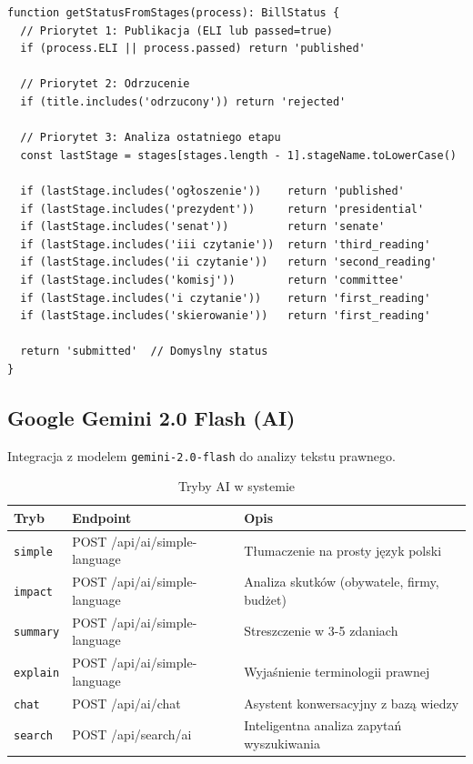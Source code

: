 \documentclass[12pt,a4paper]{article}
\begin{document}
\begin{lstlisting}[style=typescript, title=Algorytm getStatusFromStages()]
function getStatusFromStages(process): BillStatus {
  // Priorytet 1: Publikacja (ELI lub passed=true)
  if (process.ELI || process.passed) return 'published'
  
  // Priorytet 2: Odrzucenie
  if (title.includes('odrzucony')) return 'rejected'
  
  // Priorytet 3: Analiza ostatniego etapu
  const lastStage = stages[stages.length - 1].stageName.toLowerCase()
  
  if (lastStage.includes('ogłoszenie'))    return 'published'
  if (lastStage.includes('prezydent'))     return 'presidential'
  if (lastStage.includes('senat'))         return 'senate'
  if (lastStage.includes('iii czytanie'))  return 'third_reading'
  if (lastStage.includes('ii czytanie'))   return 'second_reading'
  if (lastStage.includes('komisj'))        return 'committee'
  if (lastStage.includes('i czytanie'))    return 'first_reading'
  if (lastStage.includes('skierowanie'))   return 'first_reading'
  
  return 'submitted'  // Domyslny status
}
\end{lstlisting}

\subsection{Google Gemini 2.0 Flash (AI)}

Integracja z modelem \texttt{gemini-2.0-flash} do analizy tekstu prawnego.

\begin{table}[H]
\centering
\renewcommand{\arraystretch}{1.3}
\begin{tabularx}{\textwidth}{l l X}
\toprule
\textbf{Tryb} & \textbf{Endpoint} & \textbf{Opis} \\
\midrule
\texttt{simple} & POST /api/ai/simple-language & Tłumaczenie na prosty język polski \\
\texttt{impact} & POST /api/ai/simple-language & Analiza skutków (obywatele, firmy, budżet) \\
\texttt{summary} & POST /api/ai/simple-language & Streszczenie w 3-5 zdaniach \\
\texttt{explain} & POST /api/ai/simple-language & Wyjaśnienie terminologii prawnej \\
\texttt{chat} & POST /api/ai/chat & Asystent konwersacyjny z bazą wiedzy \\
\texttt{search} & POST /api/search/ai & Inteligentna analiza zapytań wyszukiwania \\
\bottomrule
\end{tabularx}
\caption{Tryby AI w systemie}
\end{table}
\end{document}
